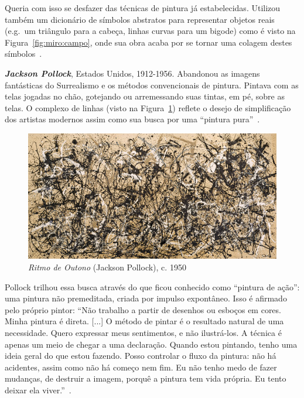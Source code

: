 Queria com isso se desfazer das técnicas de pintura
já estabelecidas. Utilizou também um dicionário de símbolos abstratos para
representar objetos reais (e.g.\ um triângulo para a cabeça, linhas curvas para
um bigode) como é visto na Figura~\ref{fig:miro:campo}, onde sua obra acaba por
se tornar uma colagem destes símbolos~\cite{stich}.

\textbf{\emph{Jackson Pollock}}, Estados Unidos, 1912-1956. Abandonou
as imagens fantásticas do Surrealismo e os métodos convencionais de
pintura. Pintava com as telas jogadas no chão, gotejando ou
arremessando suas tintas, em pé, sobre as telas. O complexo de linhas (visto na Figura~\ref{fig:pollock:ritmo}) reflete
o desejo de simplificação dos artistas modernos assim como sua busca
por uma ``pintura pura''~\cite{gombrich}. 

\begin{figure}[h!]
  \begin{center}
    \includegraphics{figs/pollock_ritmo.png}
  \end{center}
  \caption{\emph{Ritmo de Outono} (Jackson Pollock), c. 1950}
  \label{fig:pollock:ritmo}
\end{figure}

Pollock trilhou essa busca
através do que ficou conhecido como ``pintura de ação'': uma pintura
não premeditada, criada por impulso expontâneo. Isso é afirmado pelo
próprio pintor: ``Não trabalho a partir de desenhos ou esboços em
cores. Minha pintura é direta. [...] O método de pintar é o resultado
natural de uma necessidade. Quero expressar meus sentimentos, e não
ilustrá-los. A técnica é apenas um meio de chegar a uma
declaração. Quando estou pintando, tenho uma ideia geral do que estou
fazendo. Posso controlar o fluxo da pintura: não há acidentes, assim
como não há começo nem fim. Eu não tenho medo de fazer mudanças, de
destruir a imagem, porquê a pintura tem vida própria. Eu tento deixar
ela viver.''~\cite{pollock}.

